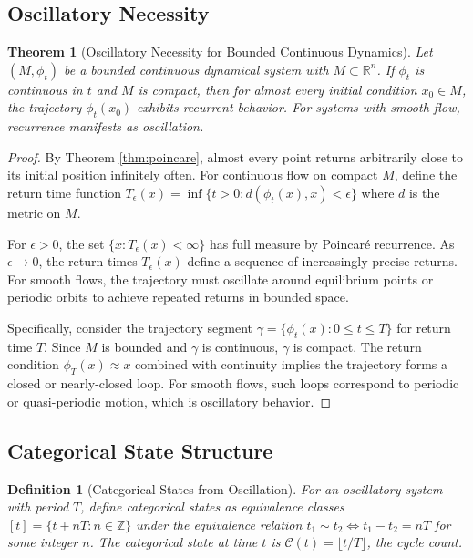 \documentclass[twocolumn,10pt]{article}
\newtheorem{theorem}{Theorem}[section]
\newtheorem{definition}{Definition}[section]
\begin{document}
\subsection{Oscillatory Necessity}

\begin{theorem}[Oscillatory Necessity for Bounded Continuous Dynamics]
\label{thm:oscillatory_necessity}
Let $(M, \phi_t)$ be a bounded continuous dynamical system with $M \subset \mathbb{R}^n$. If $\phi_t$ is continuous in $t$ and $M$ is compact, then for almost every initial condition $x_0 \in M$, the trajectory $\phi_t(x_0)$ exhibits recurrent behavior. For systems with smooth flow, recurrence manifests as oscillation.
\end{theorem}

\begin{proof}
By Theorem \ref{thm:poincare}, almost every point returns arbitrarily close to its initial position infinitely often. For continuous flow on compact $M$, define the return time function $T_\epsilon(x) = \inf\{t > 0 : d(\phi_t(x), x) < \epsilon\}$ where $d$ is the metric on $M$. 

For $\epsilon > 0$, the set $\{x : T_\epsilon(x) < \infty\}$ has full measure by Poincar\'e recurrence. As $\epsilon \to 0$, the return times $T_\epsilon(x)$ define a sequence of increasingly precise returns. For smooth flows, the trajectory must oscillate around equilibrium points or periodic orbits to achieve repeated returns in bounded space.

Specifically, consider the trajectory segment $\gamma = \{\phi_t(x) : 0 \leq t \leq T\}$ for return time $T$. Since $M$ is bounded and $\gamma$ is continuous, $\gamma$ is compact. The return condition $\phi_T(x) \approx x$ combined with continuity implies the trajectory forms a closed or nearly-closed loop. For smooth flows, such loops correspond to periodic or quasi-periodic motion, which is oscillatory behavior.
\end{proof}

\subsection{Categorical State Structure}

\begin{definition}[Categorical States from Oscillation]
For an oscillatory system with period $T$, define categorical states as equivalence classes $[t] = \{t + nT : n \in \mathbb{Z}\}$ under the equivalence relation $t_1 \sim t_2 \iff t_1 - t_2 = nT$ for some integer $n$. The categorical state at time $t$ is $\mathcal{C}(t) = \lfloor t/T \rfloor$, the cycle count.
\end{definition}
\end{document}
